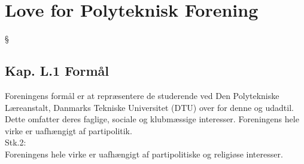 \section{Love for Polyteknisk Forening}
\begin{list}
{\S {}}{}

\subsection{Kap. L.1 Formål}
\item Foreningens formål er at repræsentere de studerende ved Den Polytekniske Læreanstalt, Danmarks Tekniske Universitet (DTU) over for denne og udadtil. Dette omfatter deres faglige, sociale og klubmæssige interesser. Foreningens hele virke er uafhængigt af partipolitik. 
\\
Stk.2: \\
Foreningens hele virke er uafhængigt af partipolitiske og religiøse interesser.



\end{list}
